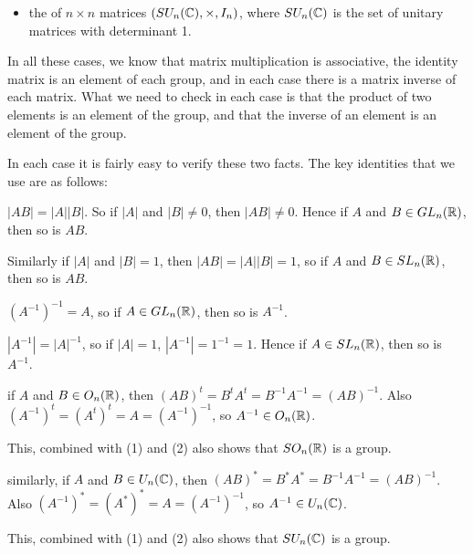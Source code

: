 \begin{example}
\begin{itemize}
    \item the  of
    $n \times n$ matrices $(SU_{n}(\mathbb{C}), \times, I_{n})$, where $SU_{n}(\mathbb{C})$
    is the set of unitary matrices with determinant 1.
  \end{itemize}
  
  In all these cases, we know that matrix multiplication is associative, the
  identity matrix is an element of each group, and in each case there is a
  matrix inverse of each matrix.  What we need to check in each case is that
  the product of two elements is an element of the group, and that the inverse
  of an element is an element of the group.
  
  In each case it is fairly easy to verify these two facts.  The key
  identities that we use are as follows:
  \begin{theoremenum}
    \item $|AB| = |A||B|$. So if $|A|$ and $|B| \ne 0$, then $|AB| \ne 0$.
      Hence if $A$ and $B \in GL_{n}(\mathbb{R})$, then so is $AB$.
      
      Similarly if $|A|$ and $|B| = 1$, then $|AB| = |A||B| = 1$, so
      if $A$ and $B \in SL_{n}(\mathbb{R})$, then so is $AB$.
    
    \item $(A^{-1})^{-1} = A$, so if $A \in GL_{n}(\mathbb{R})$, then so is
      $A^{-1}$.
    
    \item $|A^{-1}| = |A|^{-1}$, so if $|A| = 1$, $|A^{-1}| = 1^{-1} = 1$.
      Hence if $A \in SL_{n}(\mathbb{R})$, then so is $A^{-1}$.
    
    \item if $A$ and $B \in O_{n}(\mathbb{R})$, then $(AB)^{t} = B^{t}A^{t} =
      B^{-1}A^{-1} = (AB)^{-1}$.  Also $(A^{-1})^{t} = (A^{t})^{t} = A =
      (A^{-1})^{-1}$, so $A^{-1} \in O_{n}(\mathbb{R})$.
      
      This, combined with (1) and (2) also shows that $SO_{n}(\mathbb{R})$ is a
      group.
    
    \item similarly, if $A$ and $B \in U_{n}(\mathbb{C})$, then $(AB)^{*} = B^{*}A^{*} =
      B^{-1}A^{-1} = (AB)^{-1}$.  Also $(A^{-1})^{*} = (A^{*})^{*} = A =
      (A^{-1})^{-1}$, so $A^{-1} \in U_{n}(\mathbb{C})$.
      
      This, combined with (1) and (2) also shows that $SU_{n}(\mathbb{C})$ is a
      group.
  \end{theoremenum}
\end{example}


